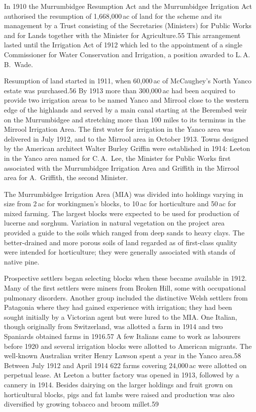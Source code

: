 In 1910 the Murrumbidgee Resumption Act and the Murrumbidgee
Irrigation Act authorised the resumption of 1,668,000\,ac of land for
the scheme and its management by a Trust consisting of the Secretaries
(Ministers) for Public Works and for Lands together with the Minister
for Agriculture.55 This arrangement lasted until the Irrigation Act of
1912 which led to the appointment of a single Commissioner for Water
Conservation and Irrigation, a position awarded to L.\,A.\,B.~Wade.

Resumption of land started in 1911, when 60,000\,ac of McCaughey's
North Yanco estate was purchased.56 By 1913 more than 300,000\,ac had
been acquired to provide two irrigation areas to be named Yanco and
Mirrool close to the western edge of the highlands and served by a
main canal starting at the Berembed weir on the Murrumbidgee and
stretching more than 100 miles to its terminus in the Mirrool
Irrigation Area. The first water for irrigation in the Yanco area was
delivered in July 1912, and to the Mirrool area in October 1913.
Towns designed by the American architect Walter Burley Griffin were
established in 1914: Leeton in the Yanco area named for C.\,A.~Lee,
the Minister for Public Works first associated with the Murrumbidgee
Irrigation Area and Griffith in the Mirrool area for A.~Griffith, the
second Minister.

The Murrumbidgee Irrigation Area (MIA) was divided into holdings
varying in size from 2\,ac for workingmen's blocks, to 10\,ac for
horticulture and 50\,ac for mixed farming.  The largest blocks were
expected to be used for production of lucerne and sorghum.  Variation
in natural vegetation on the project area provided a guide to the
soils which ranged from deep sands to heavy clays.  The better-drained
and more porous soils of land regarded as of first-class quality were
intended for horticulture; they were generally associated with stands
of native pine.

Prospective settlers began selecting blocks when these became
available in 1912.  Many of the first settlers were miners from Broken
Hill, some with occupational pulmonary disorders.  Another group
included the distinctive Welsh settlers from Patagonia where they had
gained experience with irrigation; they had been sought initially by a
Victorian agent but were lured to the MIA.  One Italian, though
originally from Switzerland, was allotted a farm in 1914 and two
Spaniards obtained farms in 1916.57 A few Italians came to work as
labourers before 1920 and several irrigation blocks were allotted to
American migrants.  The well-known Australian writer Henry Lawson
spent a year in the Yanco area.58 Between July 1912 and April 1914 622
farms covering 24,000\,ac were allotted on perpetual lease.  At Leeton
a butter factory was opened in 1913, followed by a cannery in 1914.
Besides dairying on the larger holdings and fruit grown on
horticultural blocks, pigs and fat lambs were raised and production
was also diversified by growing tobacco and broom millet.59

